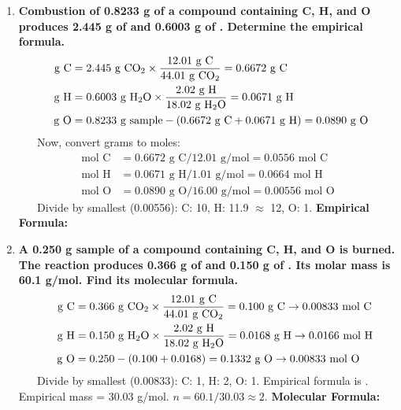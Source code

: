 \documentclass{article}
\begin{document}
\begin{enumerate}[itemsep=5pt]
    \item \textbf{Combustion of 0.8233 g of a compound containing C, H, and O produces 2.445 g of  and 0.6003 g of . Determine the empirical formula.}
    \begin{align*}
        \text{g C} &= 2.445 \text{ g } \ce{CO2} \times \frac{12.01 \text{ g C}}{44.01 \text{ g } \ce{CO2}} = 0.6672 \text{ g C} \\
        \text{g H} &= 0.6003 \text{ g } \ce{H2O} \times \frac{2.02 \text{ g H}}{18.02 \text{ g } \ce{H2O}} = 0.0671 \text{ g H} \\
        \text{g O} &= 0.8233 \text{ g sample} - (0.6672 \text{ g C} + 0.0671 \text{ g H}) = 0.0890 \text{ g O}
    \end{align*}
    Now, convert grams to moles:
    \begin{align*}
        \text{mol C} &= 0.6672 \text{ g C} / 12.01 \text{ g/mol} = 0.0556 \text{ mol C} \\
        \text{mol H} &= 0.0671 \text{ g H} / 1.01 \text{ g/mol} = 0.0664 \text{ mol H} \\
        \text{mol O} &= 0.0890 \text{ g O} / 16.00 \text{ g/mol} = 0.00556 \text{ mol O}
    \end{align*}
    Divide by smallest (0.00556): C: 10, H: 11.9 $\approx$ 12, O: 1. \textbf{Empirical Formula: }
    
    \item \textbf{A 0.250 g sample of a compound containing C, H, and O is burned. The reaction produces 0.366 g of  and 0.150 g of . Its molar mass is 60.1 g/mol. Find its molecular formula.}
    \begin{align*}
        \text{g C} &= 0.366 \text{ g } \ce{CO2} \times \frac{12.01 \text{ g C}}{44.01 \text{ g } \ce{CO2}} = 0.100 \text{ g C} \rightarrow 0.00833 \text{ mol C} \\
        \text{g H} &= 0.150 \text{ g } \ce{H2O} \times \frac{2.02 \text{ g H}}{18.02 \text{ g } \ce{H2O}} = 0.0168 \text{ g H} \rightarrow 0.0166 \text{ mol H} \\
        \text{g O} &= 0.250 - (0.100 + 0.0168) = 0.1332 \text{ g O} \rightarrow 0.00833 \text{ mol O}
    \end{align*}
    Divide by smallest (0.00833): C: 1, H: 2, O: 1. Empirical formula is .
    Empirical mass = 30.03 g/mol. $n = 60.1 / 30.03 \approx 2$. \textbf{Molecular Formula: }


\end{enumerate}
\end{document}
